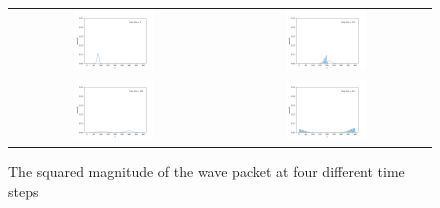 \documentclass[letterpaper,12pt]{article}
\begin{document}
    \begin{figure}[H]
        \centering
        \begin{tabular}{cc}
            \includegraphics[width=0.4\textwidth]{well1.png}
            &
            \includegraphics[width=0.4\textwidth]{well252.png}
            \\
            \includegraphics[width=0.4\textwidth]{well400.png}
            &
            \includegraphics[width=0.4\textwidth]{well612.png}
        \end{tabular}
        \caption[Well Propagation]{The squared magnitude of the wave packet at
        four different time steps}
        \label{fig:wellanim}
    \end{figure}
\end{document}
